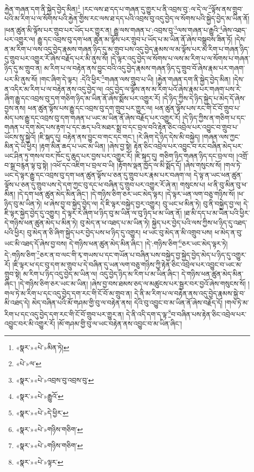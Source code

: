 རྐྱེན་གཞན་དག་ནི་སྐྱེད་བྱེད་མིན།\footnote{«སྣར་»«པེ་»མིན་ཏེ།} །རང་ལས་ཐ་དད་པ་གཞན་དུ་གྱུར་པ་ནི་འབྲས་བུ་:ལ་དེ་ལ་\footnote{«པེ་»ལ་}ལྟོས་ནས་གྲུབ་པའི་མ་རིག་པ་ལ་སོགས་པའི་རྐྱེན་གྱིས་རང་ལས་ཐ་དད་པའི་འབྲས་བུ་འདུ་བྱེད་ལ་སོགས་པའི་སྐྱེད་བྱེད་མ་ཡིན་ནོ། །ཕན་ཚུན་མི་ལྟོས་པར་གྲུབ་པར་ཡོད་པར་གྱུར་ན། རྒྱུ་ལས་གཞན་པ་:འབྲས་བུ་\footnote{«སྣར་»«པེ་»འབྲས་བུ་འབྲས་བུ་}ལས་གཞན་པ་རྒྱུའི་\footnote{«སྣར་»«པེ་»རྒྱུའོ་}ཞེས་འཐད་པར་འགྱུར་ལ། རྒྱུ་དང་འབྲས་བུ་དག་ཕན་ཚུན་མ་ལྟོས་པར་གྲུབ་པ་ཡོད་པ་མ་ཡིན་ནོ་ཞེས་བསྒྲུབས་ཟིན་ཏོ། །དེས་ན་མ་རིག་པ་ལས་འདུ་བྱེད་རྣམས་གཞན་ཉིད་དུ་མ་གྲུབ་པས་འདུ་བྱེད་རྣམས་ལ་མ་ལྟོས་པར་མ་རིག་པ་གཞན་ཉིད་དུ་གྲུབ་པར་འགྱུར་རོ་ཞེས་བརྗོད་པར་མི་ནུས་སོ། །དེ་ལྟར་འདུ་བྱེད་ལ་སོགས་པ་ལས་མ་རིག་པ་ལ་སོགས་པ་གཞན་ཉིད་དུ་མ་གྲུབ་ན། མ་རིག་པ་ལ་བརྟེན་ནས་བྱུང་བའི་འདུ་བྱེད་རྣམས་གཞན་ཉིད་དུ་གྲུབ་བོ་ཞེས་རྣམ་པར་གཞག་པར་མི་ནུས་སོ། །གང་ཞིག་དེ་ལྟར། :དེའི་ཕྱིར་\footnote{«སྣར་»«པེ་»དེ་ཕྱིར་}གཞན་ལས་གྲུབ་པ་ཡི། །རྐྱེན་གཞན་དག་ནི་སྐྱེད་བྱེད་མིན། །དེས་ན་འདིར་མ་རིག་པ་ལ་བརྟེན་ནས་འདུ་བྱེད་ལ། འདུ་བྱེད་ལ་ལྟོས་ནས་མ་རིག་པའོ་ཞེས་རྣམ་པར་གཞག་པས་རེ་ཞིག་རྒྱུ་དང་འབྲས་བུ་དག་གཅིག་ཉིད་མ་ཡིན་ནོ་ཞེས་སྨོས་པར་འགྱུར་རོ། །དེ་ཉིད་ཀྱིས་དེ་ཉིད་སྐྱེད་པ་མེད་དོ་ཞེས་བྱས་ནས། ཕན་ཚུན་ལྟོས་པས་རྒྱུ་དང་འབྲས་བུ་དག་གྲུབ་པར་གྱུར་ལ། ཕན་ཚུན་ལྟོས་པས་རང་གི་ངོ་བོ་གྲུབ་པ་མེད་པས་རྒྱུ་དང་འབྲས་བུ་དག་གཞན་པ་ཡང་མ་ཡིན་ནོ་ཞེས་བརྗོད་པར་འགྱུར་རོ། །དེ་ཉིད་ཀྱིས་ན་གཅིག་པ་དང་གཞན་པ་དག་མེད་པས་རྟག་པ་དང་ཆད་པའི་མཐར་སྨྲ་བ་དང་བྲལ་བའི་རྟེན་ཅིང་འབྲེལ་པར་འབྱུང་བ་གྲུབ་པ་ཡོངས་སུ་སྐྱེའོ། །ཇི་སྐད་དུ། བརྟེན་ནས་བྱུང་བ་གང་དང་གང་། །རེ་ཞིག་དེ་ཉིད་དེས་མི་བསྐྱེད། །གཞན་ལས་ཀྱང་མིན་དེ་ཡི་ཕྱིར། །རྟག་མིན་ཆད་པ་ཡང་མ་ཡིན། །ཞེས་བྱ་སྟེ། རྟེན་ཅིང་འབྲེལ་པར་འབྱུང་བ་རང་བཞིན་མེད་པར་ཡང་ཤིན་ཏུ་གསལ་བར་ཁོང་དུ་ཆུད་པར་བྱས་པར་འགྱུར་རོ། །ཇི་སྐད་དུ། གཅིག་ཉིད་གཞན་ཉིད་དང་བྲལ་བ། །འགྲོ་བ་སྒྲ་བརྙན་ལྟ་བུ་སྟེ། །འཕོ་དང་འཇིག་པ་བྲལ་བ་ཡི། །རྟོགས་ལྡན་ཁྱོད་ལ་མི་སྨོད་དོ། །ཞེས་གསུངས་སོ། །གལ་ཏེ་ཡང་དེ་ལྟར་རྒྱུ་དང་འབྲས་བུ་དག་ཕན་ཚུན་ལྟོས་པ་ཅན་དུ་གྲུབ་པར་རྣམ་པར་བཞག་ལ། དེ་ལྟ་ན་ཡང་ཕན་ཚུན་ལྟོས་པ་ཅན་དུ་གྲུབ་པས་དེ་དག་ཀྱང་བུ་དང་ཕ་བཞིན་དུ་གྲུབ་པར་འགྱུར་རོ་ཞེ་ན། གསུངས་པ། ཕ་ནི་བུ་མིན་བུ་ཕ་མིན། །དེ་དག་ཕན་ཚུན་མེད་མིན་ཞིང་། །དེ་གཉིས་ཅིག་ཅར་ཡང་མེད་ལྟར། །དེ་ལྟར་ཡན་ལག་བཅུ་གཉིས་སོ། །ཕ་ཉིད་བུ་མ་ཡིན་ཏེ། ཕ་ཞེས་བྱ་བ་སྐྱེད་བྱེད་ལ། དེ་ཇི་ལྟར་བསྐྱེད་བྱར་འགྱུར། བུ་ཡང་ཕ་མིན་ཏེ། བུ་ནི་བསྐྱེད་བྱ་ལ། དེ་ཇི་ལྟར་སྐྱེད་བྱེད་དུ་འགྱུར། དེ་ལྟར་རེ་ཞིག་ཕ་ཉིད་བུ་མ་ཡིན་ལ་བུ་ཉིད་ཕ་མ་ཡིན་ནོ། །ཐ་མི་དད་པ་མ་ཡིན་པའི་ཕྱིར་དེ་གཉིས་ཕན་ཚུན་མེད་པ་མིན་ཏེ། བུ་མེད་ན་ཕ་འཐད་པ་མ་ཡིན་ཏེ། སྐྱེད་པར་བྱེད་པའི་ལས་ཀྱིས་ཕ་ཉིད་དུ་འཐད་པའི་ཕྱིར། བུ་མེད་ན་ཅི་ཞིག་སྐྱེད་པར་བྱེད་པས་ཕ་ཉིད་དུ་འགྱུར། ཕ་ཡང་བུ་མེད་ན་མི་འགྲུབ་པས། ཕ་མེད་ན་བུ་ཡང་མི་འཐད་དོ་ཞེས་བྱ་བས། དེ་གཉིས་ཕན་ཚུན་མེད་མིན་ཞིང་། །དེ་:གཉིས་ཅིག་\footnote{«སྣར་»«པེ་»གཉིས་གཅིག་}ཅར་ཡང་མེད་ལྟར་ཏེ། དེ་:གཉིས་ཅིག་\footnote{«སྣར་»«པེ་»གཉིས་གཅིག་}ཅར་ན་བ་ལང་གི་རྭ་གཡས་པ་དང་གཡོན་པ་བཞིན་པས་བསྐྱེད་བྱ་སྐྱེད་བྱེད་མེད་པ་ཉིད་དུ་འགྱུར་རོ། །ཇི་ལྟར་ཕ་དང་བུ་དག་མ་གྲུབ་པ་དེ་བཞིན་དུ་ཡན་ལག་བཅུ་གཉིས་ཀྱི་རྟེན་ཅིང་འབྲེལ་པར་འབྱུང་བ་ཡང་མ་གྲུབ་སྟེ། མ་རིག་པ་ཉིད་འདུ་བྱེད་མ་ཡིན་ལ། འདུ་བྱེད་ཉིད་མ་རིག་པ་མ་ཡིན་ཞིང་། དེ་གཉིས་ཕན་ཚུན་མེད་མིན་ཞིང་། །དེ་གཉིས་ཅིག་ཅར་ཡང་མ་ཡིན། །ཞེས་བྱ་བས་ཐམས་ཅད་ལ་མཚུངས་པར་སྦྱར་བར་བྱའོ་ཞེས་གསུངས་སོ། །གལ་ཏེ་མ་རིག་པ་དང་འདུ་བྱེད་དག་རང་གི་ངོ་བོ་མ་གྲུབ་ན། དེ་ནི་མ་རིག་པ་ལ་བརྟེན་ནས་འདུ་བྱེད་རྣམས་སྐྱེ་བ་མི་འཐད་དེ། མེད་བཞིན་པའི་མོ་གཤམ་གྱི་བུ་ལ་བརྟེན་ནས། དེའི་བུ་འབྱུང་བ་མ་ཡིན་ནོ་ཞེས་བརྗོད་དོ། །གལ་ཏེ་མ་རིག་པ་དང་འདུ་བྱེད་དག་རང་གི་ངོ་བོ་གྲུབ་པར་གྱུར་ན། དེ་ནི་འདི་དག་ད་ལྟ་\footnote{«སྣར་»«པེ་»ལྟར་}བ་བཞིན་པས་རྟེན་ཅིང་འབྲེལ་པར་འབྱུང་བར་མི་འགྱུར་རོ། །མོ་གཤམ་གྱི་བུ་ལ་ཡང་བརྟེན་ནས་འབྱུང་བ་མ་ཡིན་ཞིང་། 